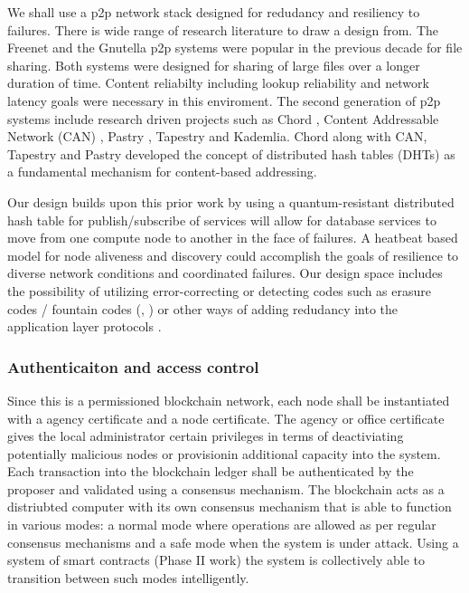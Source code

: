 We shall use a p2p network stack designed for redudancy and resiliency to failures. There is wide range of research
literature to draw a design from.  The Freenet \cite{freenet_thesis, Clarke_2001} and the Gnutella \cite{Gnutella} p2p
systems were popular in the previous decade for file sharing. Both systems were designed for sharing of large files over
a longer duration of time. Content reliabilty including lookup reliability and network latency goals were necessary in
this enviroment. The second generation of p2p systems include research driven projects such as Chord \cite{Stoica_2001},
Content Addressable Network (CAN) \cite{Ratnasamy_2001}, Pastry \cite{Rowstron_2001}, Tapestry \cite{tapestry2004} and
Kademlia. Chord along with CAN, Tapestry and Pastry developed the concept of distributed hash tables (DHTs) as a
fundamental mechanism for content-based addressing.

Our design builds upon this prior work by using a quantum-resistant distributed hash table for
publish/subscribe of services will allow for database services to move from one compute node to another in the face of
failures. A heatbeat based model for node aliveness and discovery could accomplish the goals of resilience to diverse
network conditions and coordinated failures. Our design space includes the possibility of utilizing error-correcting or
detecting codes such as erasure codes / fountain codes (\cite{byers1998}, \cite{hu2013}) or other ways of adding
redudancy into the application layer protocols \cite{bloxroute}.

\subsubsection{Authenticaiton and access control}

Since this is a permissioned blockchain network, each node shall be instantiated with a agency certificate and a node
certificate. The agency or office certificate gives the local administrator certain privileges in terms of deactiviating
potentially malicious nodes or provisionin additional capacity into the system. Each transaction into the blockchain
ledger shall be authenticated by the proposer and validated using a consensus mechanism. The blockchain acts as a
distriubted computer with its own consensus mechanism that is able to function in various modes: a normal mode where
operations are allowed as per regular consensus mechanisms and a safe mode when the system is under attack. Using a
system of smart contracts (Phase II work) the system is collectively able to transition between such modes intelligently.

